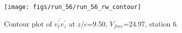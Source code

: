 \begin{figure}[H]
\centering
\texttt{[image: figs/run\_56/run\_56\_rw\_contour]}
\caption{Contour plot of $\overline{v_{r}^{\prime} v_{z}^{\prime}}$ at $z/c$=9.50, $V_{free}$=24.97, station 6.}
\label{fig:run_56_rw_contour}
\end{figure}


